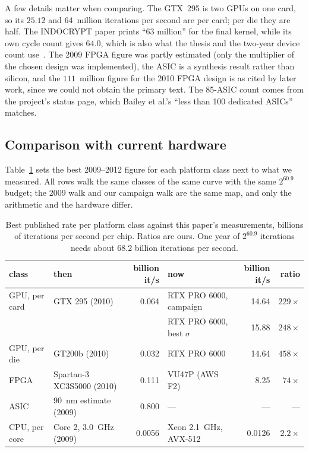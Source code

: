 A few details matter when comparing. The GTX~295 is two GPUs on one
card, so its $25.12$ and $64$~million iterations per second are per
card; per die they are half. The INDOCRYPT paper prints ``63 million''
for the final kernel, while its own cycle count gives $64.0$, which is
also what the thesis and the two-year device count
use~\cite{bernstein2010gpu,niederhagen2012thesis}. The 2009 FPGA figure
was partly estimated (only the multiplier of the chosen design was
implemented), the ASIC is a synthesis result rather than silicon, and
the $111$~million figure for the 2010 FPGA design is as cited by later
work, since we could not obtain the primary text. The 85-ASIC count
comes from the project's status page, which Bailey et al.'s ``less than
100 dedicated ASICs'' matches.



\subsection{Comparison with current hardware}
\label{sec:history-compare}

Table~\ref{tab:history-compare} sets the best 2009--2012 figure for
each platform class next to what we measured. All rows walk the same
classes of the same curve with the same $2^{60.9}$ budget; the 2009
walk and our campaign walk are the same map, and only the arithmetic
and the hardware differ.

\begin{table}[t]
\centering
\footnotesize
\caption{Best published rate per platform class against this paper's
  measurements, billions of iterations per second per chip. Ratios
  are ours. One year of $2^{60.9}$ iterations needs about $68.2$ billion
  iterations per second.}
\label{tab:history-compare}
\begin{tabular}{@{}llrlrr@{}}
\toprule
class & then & billion it/s & now & billion it/s & ratio \\
\midrule
GPU, per card & GTX 295 (2010) & 0.064 & RTX PRO 6000, campaign & 14.64 & $229\times$ \\
 & & & RTX PRO 6000, best $\sigma$ & 15.88 & $248\times$ \\
GPU, per die & GT200b (2010) & 0.032 & RTX PRO 6000 & 14.64 & $458\times$ \\
FPGA & Spartan-3 XC3S5000 (2010) & 0.111 & VU47P (AWS F2) & 8.25 & $74\times$ \\
ASIC & 90~nm estimate (2009) & 0.800 & --- & --- & --- \\
CPU, per core & Core 2, 3.0~GHz (2009) & 0.0056 & Xeon 2.1~GHz, AVX-512 & 0.0126 & $2.2\times$ \\
\bottomrule
\end{tabular}
\end{table}

